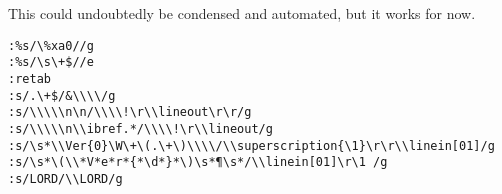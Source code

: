 \documentclass{article}
\newcommand\Ver[1]{\flagverse{#1}}
\newcommand\superscription[1]{\textsc{#1}\par}
\newcommand\linein[1][01]{\begin{patverse*}\indentpattern{#1}}
\newcommand\lineout{\end{patverse*}}
\newcommand\LORD{\textsc{Lord}}
\begin{document}
This could undoubtedly be condensed and automated, but it works for now.

\begin{verbatim}
:%s/\%xa0//g
:%s/\s\+$//e
:retab
:s/.\+$/&\\\\/g
:s/\\\\\n\n/\\\\!\r\\lineout\r\r/g
:s/\\\\\n\\ibref.*/\\\\!\r\\lineout/g
:s/\s*\\Ver{0}\W\+\(.\+\)\\\\/\\superscription{\1}\r\r\\linein[01]/g
:s/\s*\(\\*V*e*r*{*\d*}*\)\s*¶\s*/\\linein[01]\r\1 /g
:s/LORD/\\LORD/g
\end{verbatim}
\end{document}
